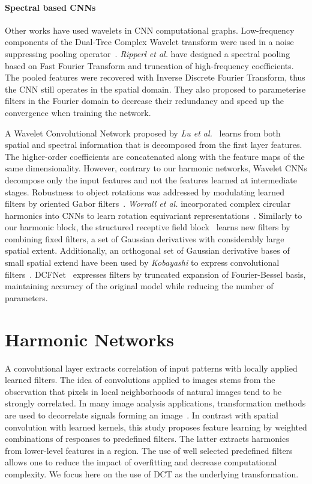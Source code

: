 \documentclass[12pt,a4paper]{article}
\begin{document}
\paragraph{Spectral based CNNs}
Other works have used wavelets in CNN computational graphs. 
Low-frequency components of the Dual-Tree Complex Wavelet transform were used in a noise suppressing pooling operator~\cite{Duan17}. 
\textit{Ripperl et al.} have designed a spectral pooling~\cite{Rippel15} based on Fast Fourier Transform and truncation of high-frequency coefficients. 
The pooled features were recovered with Inverse Discrete Fourier Transform, thus the CNN still operates in the spatial domain.
They also proposed to parameterise filters in the Fourier domain to decrease their redundancy and speed up the convergence when training the network. 


A Wavelet Convolutional Network proposed by \textit{Lu et al.}~\cite{Lu18} learns from both spatial and spectral information that is decomposed from the first layer features. The higher-order coefficients are concatenated along with the feature maps of the same dimensionality. 
However, contrary to our harmonic networks, Wavelet CNNs decompose only the input features and not the features learned at intermediate stages. 
Robustness to object rotations was addressed by modulating learned filters by oriented Gabor filters~\cite{Luan18}. \textit{Worrall et al.} incorporated complex circular harmonics into CNNs to learn rotation equivariant representations~\cite{Worrall17}. Similarly to our harmonic block, the structured receptive field block~\cite{Jacobsen16} learns new filters by combining fixed filters, a set of Gaussian derivatives with considerably large spatial extent. Additionally, an orthogonal set of Gaussian derivative bases of small spatial extend have been used by \textit{Kobayashi} to express convolutional filters~\cite{Kobayashi18}. DCFNet~\cite{Qiu18} expresses filters by truncated expansion of Fourier-Bessel basis, maintaining accuracy of the original model while reducing the number of parameters. 



\section{Harmonic Networks}\label{sec:method}

A convolutional layer extracts correlation of input patterns with locally applied learned filters. The idea of convolutions applied to images stems from the observation that pixels in local neighborhoods of natural images tend to be strongly correlated. In many image analysis applications, transformation methods are used to decorrelate signals forming an image~\cite{Wang12}. In contrast with spatial convolution with learned kernels, this study proposes feature learning by weighted combinations of responses to predefined filters. The latter extracts harmonics from lower-level features in a region. The use of well selected predefined filters allows one to reduce the impact of overfitting and decrease computational complexity. We focus here on the use of DCT as the underlying transformation.
\end{document}
